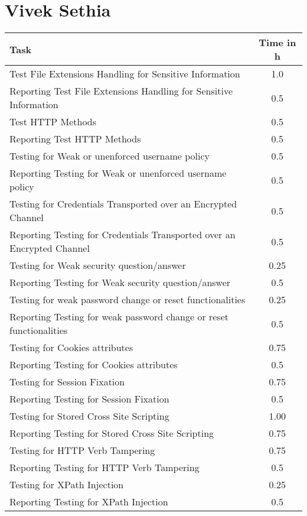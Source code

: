 \section{Vivek Sethia}
\begin{table}[H]
\tiny
\begin{tabular*}{\textwidth}{@{\extracolsep{\fill}} l c@{\extracolsep{0pt}} }
\textbf{Task} & \textbf{Time in h} \\ \hline
Test File Extensions Handling for Sensitive Information & 1.0 \\
Reporting Test File Extensions Handling for Sensitive Information & 0.5 \\
Test HTTP Methods                           & 0.5 \\
Reporting Test HTTP Methods                 & 0.5 \\
Testing for Weak or unenforced username policy & 0.5 \\
Reporting Testing for Weak or unenforced username policy & 0.5 \\
Testing for Credentials Transported over an Encrypted Channel & 0.5 \\
Reporting Testing for Credentials Transported over an Encrypted Channel & 0.5 \\
Testing for Weak security question/answer   & 0.25 \\
Reporting Testing for Weak security question/answer & 0.5 \\
Testing for weak password change or reset functionalities & 0.25 \\
Reporting Testing for weak password change or reset functionalities & 0.5 \\
Testing for Cookies attributes              & 0.75 \\
Reporting Testing for Cookies attributes    & 0.5 \\
Testing for Session Fixation                & 0.75 \\
Reporting Testing for Session Fixation      & 0.5 \\
Testing for Stored Cross Site Scripting     & 1.00 \\
Reporting Testing for Stored Cross Site Scripting & 0.75 \\
Testing for HTTP Verb Tampering             & 0.75 \\
Reporting Testing for HTTP Verb Tampering   & 0.5 \\
Testing for XPath Injection                 & 0.25 \\
Reporting Testing for XPath Injection       & 0.5 \\

\end{tabular*}
\end{table}
